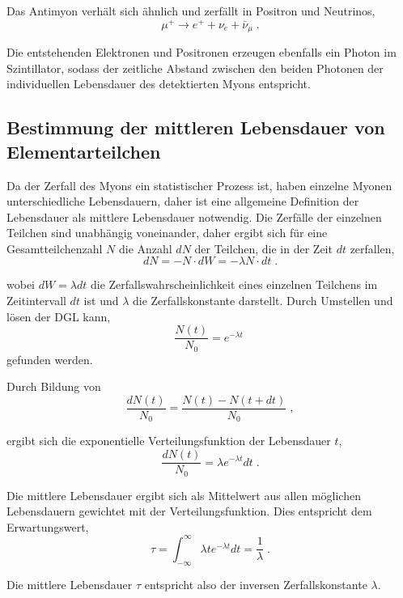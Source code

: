 Das Antimyon verhält sich ähnlich und zerfällt in Positron und Neutrinos, $$\mu^+ \rightarrow e^+ + \nu_e + \bar{\nu}_\mu\; .$$

Die entstehenden Elektronen und Positronen erzeugen ebenfalls ein Photon im Szintillator, sodass der zeitliche Abstand zwischen den beiden Photonen der individuellen Lebensdauer des detektierten Myons entspricht.

\subsection{Bestimmung der mittleren Lebensdauer von Elementarteilchen}

Da der Zerfall des Myons ein statistischer Prozess ist, haben einzelne Myonen unterschiedliche Lebensdauern, daher ist eine allgemeine Definition der Lebensdauer als mittlere Lebensdauer notwendig. Die Zerfälle der einzelnen Teilchen sind unabhängig voneinander, daher ergibt sich für eine Gesamtteilchenzahl $N$ die Anzahl $dN$ der Teilchen, die in der Zeit $dt$ zerfallen, $$dN = -N \cdot dW = -\lambda N \cdot dt\; . $$

wobei $dW = \lambda dt$ die Zerfallswahrscheinlichkeit eines einzelnen Teilchens im Zeitintervall $dt$ ist und $\lambda$ die Zerfallskonstante darstellt. Durch Umstellen und lösen der DGL kann, $$\frac{N(t)}{N_0} = e^{-\lambda t}\;  $$ gefunden werden.

Durch Bildung von $$\frac{dN(t)}{N_0} = \frac{N(t) - N(t+dt)}{N_0}\;  ,  $$

ergibt sich die exponentielle Verteilungsfunktion der Lebensdauer $t$, $$\frac{dN(t)}{N_0} = \lambda e^{-\lambda t} dt\; .$$

Die mittlere Lebensdauer ergibt sich als Mittelwert aus allen möglichen Lebensdauern gewichtet mit der Verteilungsfunktion. Dies entspricht dem Erwartungswert, $$\tau = \int_{-\infty}^{\infty} \lambda t e^{-\lambda t} dt = \frac{1}{\lambda}\; . $$

Die mittlere Lebensdauer $\tau$ entspricht also der inversen Zerfallskonstante $\lambda$.

